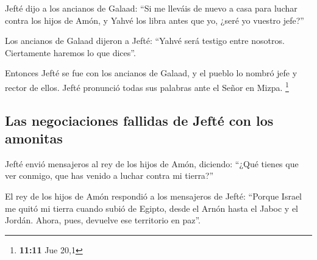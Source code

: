  Jefté dijo a los ancianos de Galaad: ``Si me lleváis de
nuevo a casa para luchar contra los hijos de Amón, y Yahvé los libra
antes que yo, ¿seré yo vuestro jefe?''

 Los ancianos de Galaad dijeron a Jefté: ``Yahvé será
testigo entre nosotros. Ciertamente haremos lo que dices''.

 Entonces Jefté se fue con los ancianos de Galaad, y el
pueblo lo nombró jefe y rector de ellos. Jefté pronunció todas sus
palabras ante el Señor en Mizpa. \footnote{\textbf{11:11} Jue 20,1}

\hypertarget{las-negociaciones-fallidas-de-jeftuxe9-con-los-amonitas}{%
\subsection{Las negociaciones fallidas de Jefté con los
amonitas}\label{las-negociaciones-fallidas-de-jeftuxe9-con-los-amonitas}}

 Jefté envió mensajeros al rey de los hijos de Amón,
diciendo: ``¿Qué tienes que ver conmigo, que has venido a luchar contra
mi tierra?''

 El rey de los hijos de Amón respondió a los mensajeros
de Jefté: ``Porque Israel me quitó mi tierra cuando subió de Egipto,
desde el Arnón hasta el Jaboc y el Jordán. Ahora, pues, devuelve ese
territorio en paz''.

